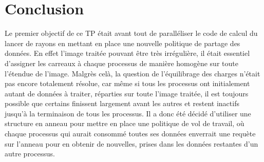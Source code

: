 \documentclass[a4paper,11pt]{article}
\begin{document}
\section{Conclusion}
Le premier objectif de ce TP était avant tout de paralléliser le code de calcul du lancer de rayons en mettant en place une nouvelle politique de partage des données. En effet l'image traitée pouvant être très irrégulière, il était essentiel d'assigner les carreaux à chaque processus de manière homogène sur toute l'étendue de l'image. Malgrès celà, la question de l'équilibrage des charges n'était pas encore totalement résolue, car même si tous les processus ont initialement autant de données à traiter, réparties sur toute l'image traitée, il est toujours possible que certains finissent largement avant les autres et restent inactifs jusqu'à la terminaison de tous les processus.  Il a donc été décidé d'utiliser une structure en anneau pour mettre en place une politique de vol de travail, où chaque processus qui aurait consommé toutes ses données enverrait une requète sur l'anneau pour en obtenir de nouvelles, prises dans les données restantes d'un autre processus. %
\end{document}
